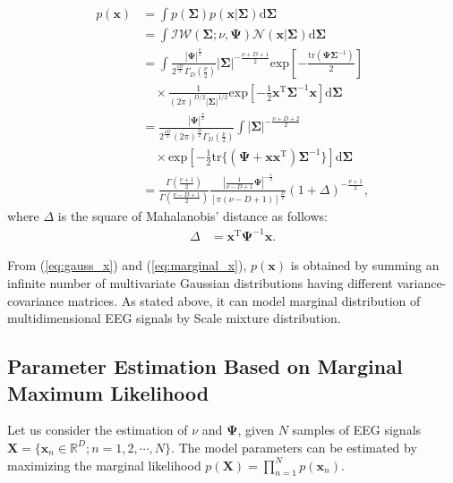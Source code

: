 \documentclass[journal]{IEEEtran}
\begin{document}
\begin{align}
	p(\mathbf{x}) &= \int p(\mathbf{\Sigma})p(\mathbf{x}|\mathbf{\Sigma}) \mathrm{d}{\mathbf{\Sigma}} \nonumber \\
		&= \int {\mathcal {IW}}(\mathbf{\Sigma}; \nu, {\mathbf{\Psi}}) {\mathcal N}(\mathbf{x}|\mathbf{\Sigma}) \mathrm{d}{\mathbf{\Sigma}} \label{eq:marginal_x} \\ %
		&= \int \frac{|{\mathbf{\Psi}}|^{\frac{\nu}{2}}}{2^{\frac{\nu D}{2}} \Gamma_D \left(\frac{\nu}{2}\right)} |\mathbf{\Sigma}|^{-\frac{\nu+D+1}{2}}\mathrm{exp} \left[-\frac{\mathrm{tr}(\mathbf{\Psi} \mathbf{\Sigma}^{-1})}{2}\right] \nonumber \\
&\quad \times\frac{1}{(2\pi)^{D/2} |\mathbf{\Sigma}|^{1/2}} \mathrm{exp} \left[-\frac{1}{2}\mathbf{x}^\mathrm{T} {\mathbf{\Sigma}}^{-1} \mathbf{x}\right] \mathrm{d}{\mathbf{\Sigma}} \nonumber \\
		&= \frac{|{\mathbf{\Psi}}|^{\frac{\nu}{2}}}{2^{\frac{\nu D}{2}} (2\pi)^\frac{D}{2} \Gamma_D \left(\frac{\nu}{2}\right)} \int |\mathbf{\Sigma}|^{-\frac{\nu+D+2}{2}}\nonumber\\
&\quad \times \mathrm{exp} \left[-\frac{1}{2}\mathrm{tr}\{(\mathbf{\Psi} + \mathbf{x} \mathbf{x}^\mathrm{T})\mathbf{\Sigma}^{-1}\}\right] \mathrm{d}{\mathbf{\Sigma}} \nonumber \\
\label{eq:p_x}
&= \frac{\Gamma(\frac{\nu+1}{2})}{\Gamma(\frac{\nu-D+1}{2})} \frac{|\frac{1}{\nu-D+1} {\mathbf{\Psi}}|^{-\frac{1}{2}}}{\left[\pi(\nu-D+1) \right]^{\frac{D}{2}}} (1+\Delta)^{-\frac{\nu+1}{2}} ,%
\end{align}
%
where $\Delta$ is the square of Mahalanobis' distance as follows:
%
\begin{align}
	\Delta &= \mathbf{x}^\mathrm{T}{\mathbf{\Psi}}^{-1}\mathbf{x}.
\end{align}
%

From (\ref{eq:gauss_x}) and (\ref{eq:marginal_x}), $p(\mathbf{x})$ is obtained by summing an infinite number of  multivariate Gaussian distributions having different variance-covariance matrices.
As stated above, it can model marginal distribution of multidimensional EEG signals by Scale mixture distribution.

\subsection{Parameter Estimation Based on Marginal Maximum Likelihood}
Let us consider the estimation of $\nu$ and $\mathbf{\Psi}$, given $N$ samples of EEG signals $\mathbf{X} = \{\mathbf{x}_n \in \mathbb{R}^{D}; n=1,2,\cdots,N \}$. The model parameters can be estimated by maximizing the marginal likelihood $p(\mathbf{X}) = \prod_{n=1}^{N} p(\mathbf{x}_n)$.
\end{document}

